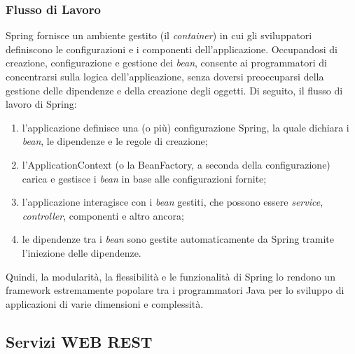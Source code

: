 \subsubsection{Flusso di Lavoro}

Spring fornisce un ambiente gestito (il \textit{container}) in cui gli sviluppatori definiscono le configurazioni e i componenti dell’applicazione.\cite{SPRING_tutorialspoint} Occupandosi di creazione, configurazione e gestione dei \textit{bean}, consente ai programmatori di concentrarsi sulla logica dell’applicazione, senza doversi preoccuparsi della gestione delle dipendenze e della creazione degli oggetti. Di seguito, il flusso di lavoro di Spring:
\begin{enumerate}
    \item l’applicazione definisce una (o più) configurazione Spring, la quale dichiara i \textit{bean}, le dipendenze e le regole di creazione;
    \item l’ApplicationContext (o la BeanFactory, a seconda della configurazione) carica e gestisce i \textit{bean} in base alle configurazioni fornite;
    \item l’applicazione interagisce con i \textit{bean} gestiti, che possono essere \textit{service}, \textit{controller}, componenti e altro ancora;
    \item le dipendenze tra i \textit{bean} sono gestite automaticamente da Spring tramite l’iniezione delle dipendenze.
\end{enumerate}
Quindi, la modularità, la flessibilità e le funzionalità di Spring lo rendono un framework estremamente popolare tra i programmatori Java per lo sviluppo di applicazioni di varie dimensioni e complessità.\cite{SPRING_javatechonline}

\subsection{Servizi WEB REST}

